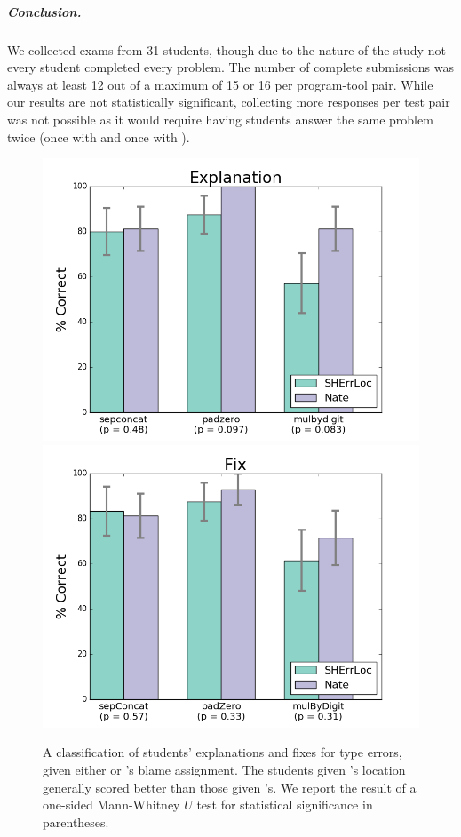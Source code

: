 \subparagraph{Conclusion.}
%
We collected exams from 31 students, though due to the nature of the
study not every student completed every problem.
%
The number of complete submissions was always at least 12 out of
a maximum of 15 or 16 per program-tool pair.
%
While our results are not statistically significant,
collecting more responses per test pair was not possible as it
would require having students answer the same problem twice (once with
\sherrloc and once with \toolname).

\begin{figure}[p]
\centering
\includegraphics[width=0.7\linewidth]{nate/user-study-reason.png}
\includegraphics[width=0.7\linewidth]{nate/user-study-fix.png}
\caption{A classification of students' explanations and fixes for type
  errors, given either \sherrloc or \toolname's blame assignment.
  The students given \toolname's location generally scored
  better than those given \sherrloc's.
  We report the result of a one-sided Mann-Whitney $U$ test for
  statistical significance in parentheses.}
\label{fig:results-user-study}
\end{figure}

